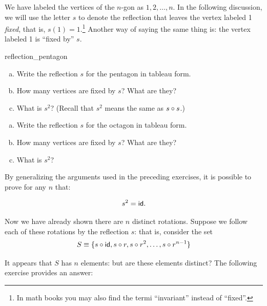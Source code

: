 We have labeled the vertices of the $n$-gon as $1,2,\ldots,n$. In the following discussion, we will use the letter  $s$ to denote the reflection that leaves the vertex labeled 1  \emph{fixed}, that is, $s(1) = 1$.\footnote{In math books you may also find the termi ``invariant'' instead of ``fixed''.}  Another way of saying the same thing is:  the vertex labeled 1 is ``fixed by'' $s$.

\begin{exercise}{reflection_pentagon}
\begin{enumerate}[(a)]
\item
Write the reflection $s$  for the pentagon in tableau form.  
\item
How many vertices are fixed by $s$? What are they?
\item
What is $s^2$?  (Recall that $s^2$ means the same as $s \circ s$.)
\end{enumerate}
\end{exercise}

\begin{exercise}{31}
\begin{enumerate}[(a)]
\item
Write the reflection $s$ for the octagon in tableau form. 
\item
How many vertices are fixed by $s$? What are they?
\item
What is $s^2$?
\end{enumerate}
\end{exercise}

By generalizing the arguments used in the preceding exercises, it is possible to prove for any $n$ that:

$$ s^2 = {\sf{i}d}.$$

Now we have already shown there are $n$ distinct rotations. Suppose we follow each of these rotations by the reflection $s$: that is, consider the set
\[
S \equiv \{s \circ {\sf{i}d}, s \circ r, s \circ r^2,
\ldots, s \circ r^{n-1}\}
\]

It appears that $S$ has $n$ elements: but are these elements distinct? The following exercise provides an answer:

